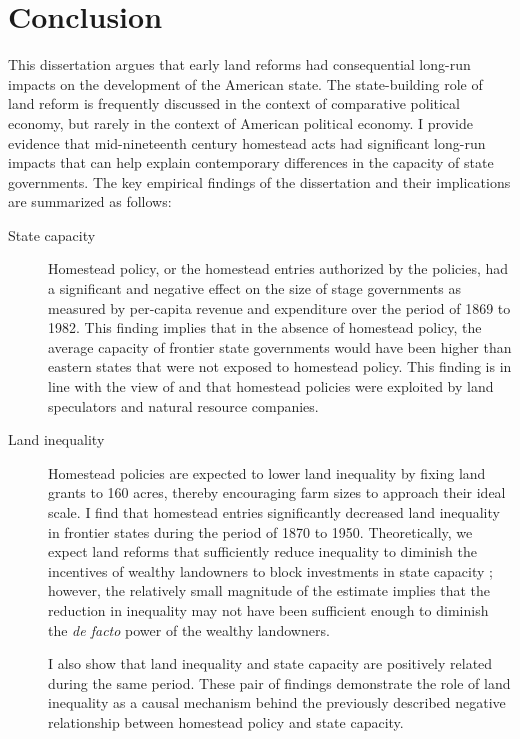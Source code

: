 \chapter{Conclusion}

This dissertation argues that early land reforms had consequential long-run impacts on the development of the American state. The state-building role of land reform is frequently discussed in the context of comparative political economy, but rarely in the context of American political economy. I provide evidence that mid-nineteenth century homestead acts had significant long-run impacts that can help explain contemporary differences in the capacity of state governments. The key empirical findings of the dissertation and their implications are summarized as follows:

\begin{description}
	\item[State capacity] Homestead policy, or the homestead entries authorized by the policies, had a significant and negative effect on the size of stage governments as measured by per-capita revenue and expenditure over the period of 1869 to 1982. This finding implies that in the absence of homestead policy, the average capacity of frontier state governments would have been higher than eastern states that were not exposed to homestead policy. This finding is in line with the view of \citet{gates1968history} and \citet{murtazashvili2013political} that homestead policies were exploited by land speculators and natural resource companies. 
	\item[Land inequality] Homestead policies are expected to lower land inequality by fixing land grants to 160 acres, thereby encouraging farm sizes to approach their ideal scale. I find that homestead entries significantly decreased land inequality in frontier states during the period of 1870 to 1950. Theoretically, we expect land reforms that sufficiently reduce inequality to diminish the incentives of wealthy landowners to block investments in state capacity \citep{besley2009origins,galor2009inequality}; however, the relatively small magnitude of the estimate implies that the reduction in inequality may not have been sufficient enough to diminish the \emph{de facto} power of the wealthy landowners. 
	
	I also show that land inequality and state capacity are positively related during the same period. These pair of findings demonstrate the role of land inequality as a causal mechanism behind the previously described negative relationship between homestead policy and state capacity. 
	

\end{description}
